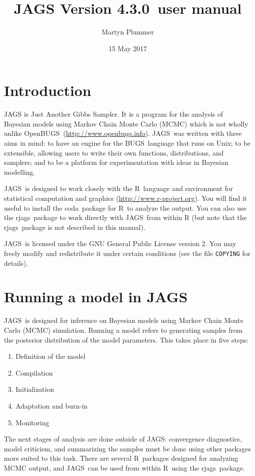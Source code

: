 \documentclass[11pt, a4paper, titlepage]{report}
\newcommand{\release}{4.3.0}
\newcommand{\JAGS}{\textsf{JAGS}}
\newcommand{\rjags}{\textsf{rjags}}
\newcommand{\BUGS}{\textsf{BUGS}}
\newcommand{\OpenBUGS}{\textsf{OpenBUGS}}
\newcommand{\R}{\textsf{R}}
\newcommand{\CODA}{\textsf{coda}}
\begin{document}
\title{JAGS Version \release\ user manual}
\author{Martyn Plummer}
\date{15 May 2017}
\maketitle

\tableofcontents

\chapter{Introduction}

JAGS is Just Another Gibbs Sampler.  It is a program for the analysis
of Bayesian models using Markov Chain Monte Carlo (MCMC) which is not
wholly unlike
\OpenBUGS\ (\url{http://www.openbugs.info}). \JAGS\ was written
with three aims in mind: to have an engine for the \BUGS\ language
that runs on Unix; to be extensible, allowing users to write their own
functions, distributions, and samplers; and to be a platform for
experimentation with ideas in Bayesian modelling.

\JAGS\ is designed to work closely with the \R\ language and
environment for statistical computation and graphics
(\url{http://www.r-project.org}).  You will find it useful to install
the \CODA\ package for \R\ to analyze the output. You can also use the
\rjags\ package to work directly with \JAGS\ from within R (but note
that the \rjags\ package is not described in this manual).

\JAGS\ is licensed under the GNU General Public License
version 2. You may freely modify and redistribute it under certain
conditions (see the file \texttt{COPYING} for details).

\chapter{Running a model in \JAGS}

\JAGS\ is designed for inference on Bayesian models using Markov Chain
Monte Carlo (MCMC) simulation.  Running a model refers to generating
samples from the posterior distribution of the model parameters.  This
takes place in five steps:
\begin{enumerate}
\item Definition of the model
\item Compilation
\item Initialization
\item Adaptation and burn-in
\item Monitoring
\end{enumerate}
The next stages of analysis are done outside of \JAGS: convergence
diagnostics, model criticism, and summarizing the samples must be done
using other packages more suited to this task. There are several
\R\ packages designed for analyzing MCMC output, and \JAGS\ can be
used from within \R\ using the \rjags\ package.
\end{document}
